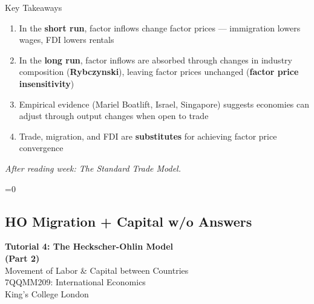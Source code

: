 \documentclass{beamer}
\newcommand{\showanswers}{1}  %
\begin{document}
\begin{frame}{Key Takeaways}

\begin{enumerate}
    \item In the \textbf{short run}, factor inflows change factor prices --- immigration lowers wages, FDI lowers rentals

    \vspace{0.2cm}

    \item In the \textbf{long run}, factor inflows are absorbed through changes in industry composition (\textbf{Rybczynski}), leaving factor prices unchanged (\textbf{factor price insensitivity})

    \vspace{0.2cm}

    \item Empirical evidence (Mariel Boatlift, Israel, Singapore) suggests economies can adjust through output changes when open to trade

    \vspace{0.2cm}

    \item Trade, migration, and FDI are \textbf{substitutes} for achieving factor price convergence
\end{enumerate}

\vspace{0.3cm}

\textit{After reading week: The Standard Trade Model.}

\end{frame}



\fi



\ifnum\showanswers=0
\subsection{HO Migration + Capital w/o Answers}


\begin{frame}

\vspace{1.5cm}

\centering
{\Large \textbf{Tutorial 4: The Heckscher-Ohlin Model \\ (Part 2)}} \\[0.5cm]
{\large Movement of Labor \& Capital between Countries} \\[1.0cm]

{\small 7QQMM209: International Economics} \\[0.3cm]
{\small King's College London}

\vfill

\end{frame}
\end{document}
